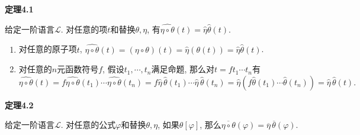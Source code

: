 \hypertarget{sec:定理4.1}{}
\noindent\textbf{定理4.1}

给定一阶语言$\mathcal{L}$. 对任意的项$t$和替换$\theta,\eta$,
有$\widehat{\eta\circ\theta}(t)=\widehat{\eta}\widehat{\theta}(t)$.


\begin{enumerate}
    \item 对任意的原子项$t$, $\widehat{\eta\circ\theta}(t)=(\eta\circ\theta)(t)=
    \widehat{\eta}(\theta(t))=\widehat{\eta}\widehat{\theta}(t)$.
    \item 对任意的$n$元函数符号$f$, 假设$t_1,\cdots,t_n$满足命题,
    那么对$t=ft_1\cdots t_n$有
    \vspace{3pt}
    \begin{equation*}
        \widehat{\eta\circ\theta}(t)=
        f\widehat{\eta\circ\theta}(t_1)\cdots\widehat{\eta\circ\theta}(t_n)=
        f\widehat{\eta}\,\widehat{\theta}(t_1)\cdots
        \widehat{\eta}\,\widehat{\theta}(t_n)=
        \widehat{\eta}\left(f\widehat{\theta}(t_1)\cdots\widehat{\theta}(t_n)\right)
        =\widehat{\eta}\,\widehat{\theta}(t).
    \tag*{\qedsymbol}\end{equation*}
\end{enumerate}

\vspace{10pt}

\hypertarget{sec:定理4.2}{}
\noindent\textbf{定理4.2}

给定一阶语言$\mathcal{L}$. 对任意的公式$\varphi$和替换$\theta,\eta$,
如果$\theta[\varphi]$, 那么$\overline{\eta\circ\theta}(\varphi)=
\overline{\eta}\,\overline{\theta}(\varphi)$.


